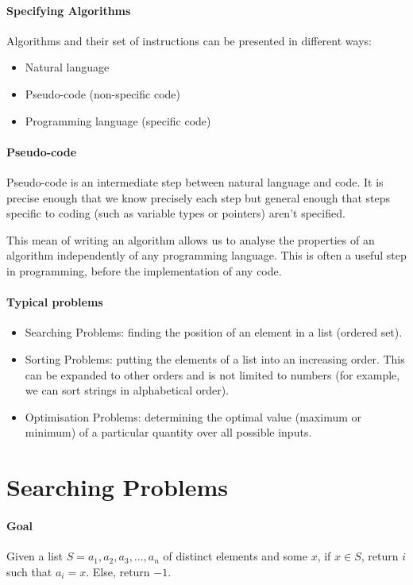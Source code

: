 \documentclass[10pt,a4paper]{book}
\begin{document}
\paragraph*{Specifying Algorithms}
Algorithms and their set of instructions can be presented in different ways:
\begin{itemize}
\item Natural language
\item Pseudo-code (non-specific code)
\item Programming language (specific code)
\end{itemize}
\paragraph*{Pseudo-code}
Pseudo-code is an intermediate step between natural language and code. It is precise enough that we know precisely each step but general enough that steps specific to coding (such as variable types or pointers) aren't specified.\par
This mean of writing an algorithm allows us to analyse the properties of an algorithm independently of any programming language. This is often a useful step in programming, before the implementation of any code.
\paragraph*{Typical problems}
\begin{itemize}
\item Searching Problems: finding the position of an element in a list (ordered set).
\item Sorting Problems: putting the elements of a list into an increasing order. This can be expanded to other orders and is not limited to numbers (for example, we can sort strings in alphabetical order).
\item Optimisation Problems: determining the optimal value (maximum or minimum) of a particular quantity over all possible inputs. 
\end{itemize}

\section{Searching Problems}
\paragraph*{Goal}
Given a list $S = a_{1},a_{2},a_{3},...,a_{n}$ of distinct elements and some $x$, if $x \in S$, return $i$ such that $a_{i} = x$. Else, return $-1$.
\end{document}

